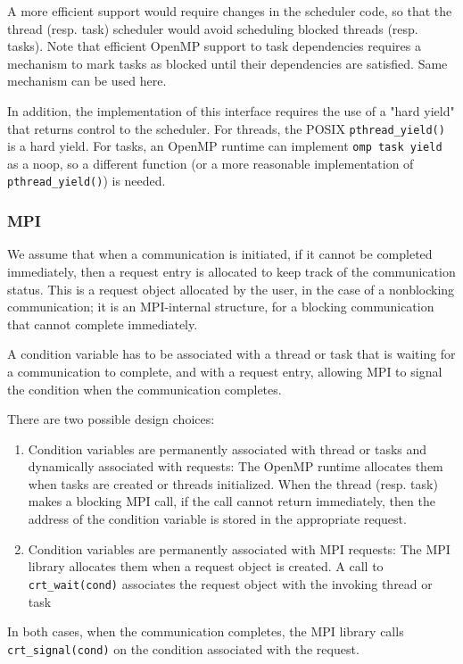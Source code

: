 \documentclass[twoside,11pt]{article}
\begin{document}
A more efficient support would require changes in the scheduler code, 
so that the thread (resp. task) scheduler would avoid scheduling blocked 
threads (resp. tasks). Note that efficient OpenMP support to task dependencies 
requires a mechanism to mark tasks as blocked until their dependencies are 
satisfied. Same mechanism can be used here.

In addition, the implementation of this interface requires the use of a "hard 
yield" that returns control to the scheduler.  For threads, the POSIX 
\texttt{pthread\_yield()} is a hard yield. For tasks, an OpenMP runtime can 
implement \texttt{omp task yield} as a noop, so a different function (or a more 
reasonable implementation of \texttt{pthread\_yield()}) is needed.

\subsubsection{MPI}

We assume that when a communication is initiated, if it cannot be completed 
immediately, then a request entry is allocated to keep track of the 
communication 
status. This is a request object allocated by the user, in the case of a 
nonblocking communication; it is an MPI-internal structure, for a blocking 
communication that cannot complete immediately.

A condition variable has to be associated with a thread or task that is waiting 
for a communication to complete, and with a request entry, allowing MPI to 
signal the condition when the communication completes.

There are two possible design choices:
\begin{enumerate}
	\item 
	Condition variables are permanently associated with thread or tasks and 
	dynamically associated with requests: The OpenMP 
	runtime allocates them when tasks are created or threads initialized.
	When the thread (resp. task) makes a blocking MPI call, if the call cannot 
	return immediately, then the address of the condition variable is stored in 
	the appropriate request.
	\item 
	Condition variables are permanently associated with MPI requests: The MPI 
	library 
	allocates them when a request object is created. A call to 
	\texttt{crt\_wait(cond)} associates the request object with the invoking 
	thread or task
\end{enumerate}

In both cases, when the communication completes, the MPI library calls 
\texttt{crt\_signal(cond)} on the condition associated with the request.
\end{document}
